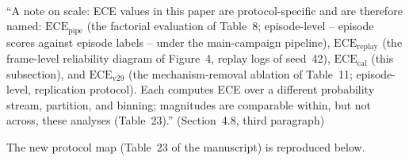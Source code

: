 \documentclass[1p,12pt,authoryear]{elsarticle}
\begin{document}
~

``A note on scale: ECE values in this paper are protocol-specific and are therefore named: $\mathrm{ECE}_{\mathrm{pipe}}$ (the factorial evaluation of Table~8; episode-level -- episode scores against episode labels -- under the main-campaign pipeline), $\mathrm{ECE}_{\mathrm{replay}}$ (the frame-level reliability diagram of Figure~4, replay logs of seed~42), $\mathrm{ECE}_{\mathrm{cal}}$ (this subsection), and $\mathrm{ECE}_{\mathrm{v29}}$ (the mechanism-removal ablation of Table~11; episode-level, replication protocol). Each computes ECE over a different probability stream, partition, and binning; magnitudes are comparable within, but not across, these analyses (Table~23).'' (Section~4.8, third paragraph)

\noindent The new protocol map (Table~23 of the manuscript) is reproduced below.
\end{document}
